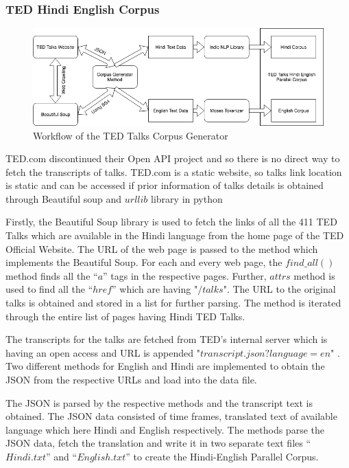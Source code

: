 \subsubsection{TED Hindi English Corpus}
\begin{figure}
\includegraphics[width=\textwidth]{figures/traindataworkflow.png}
\caption{Workflow of the TED Talks Corpus Generator} \label{fig1}
\end{figure}
TED.com discontinued their Open API project and so there is no direct way to fetch the transcripts of talks. TED.com is a static website, so talks link location is static and can be accessed if prior information of talks details is obtained through Beautiful soup and $urllib$ library in python 

Firstly, the Beautiful Soup library is used to fetch the links of all the 411 TED Talks which are available in the Hindi language from the home page of the TED Official Website. The URL of the web page is passed to the method which implements the Beautiful Soup.  For each and every web page, the $find\_all()$ method finds all the “$a$” tags in the respective pages. Further, $attrs$ method is used to find all the $“href”$ which are having "$/talks$". The URL to the original talks is obtained and stored in a list for further parsing. The method is iterated through the entire list of pages having Hindi TED Talks. 

The transcripts for the talks are fetched from TED’s internal server which is having an open access and URL is appended "$transcript.json?language=en$" . Two different methods for English and Hindi are implemented to obtain the JSON from the respective URLs and load into the data file. 

The JSON is parsed by the respective methods and the transcript text is obtained. The JSON data consisted of time frames, translated text of available language which here Hindi and English respectively. The methods parse the JSON data, fetch the translation and write it in two separate text files “$Hindi.txt$” and “$English.txt$” to create the Hindi-English Parallel Corpus.

